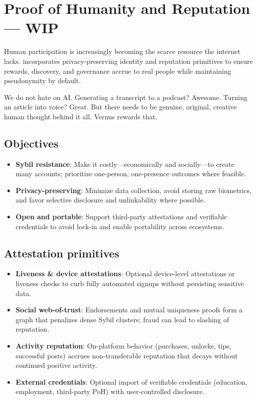 \documentclass[10pt]{article}
\begin{document}
  \section{Proof of Humanity and Reputation --- \textbf{WIP}}
    Human participation is increasingly becoming the scarce resource the internet lacks. \projectname{} incorporates privacy-preserving identity and reputation primitives to ensure rewards, discovery, and governance accrue to real people while maintaining pseudonymity by default.

    We do not hate on AI. Generating a transcript to a podcast? Awesome. Turning an article into voice? Great. But there needs to be genuine, original, creative human thought behind it all. Vernus rewards that.

    \subsection{Objectives}
      \begin{itemize}[leftmargin=*]
        \item \textbf{Sybil resistance}: Make it costly---economically and socially---to create many accounts; prioritize one-person, one-presence outcomes where feasible.
        \item \textbf{Privacy-preserving}: Minimize data collection, avoid storing raw biometrics, and favor selective disclosure and unlinkability where possible.
        \item \textbf{Open and portable}: Support third-party attestations and verifiable credentials to avoid lock-in and enable portability across ecosystems.
    \end{itemize}

    \subsection{Attestation primitives}
      \begin{itemize}[leftmargin=*]
        \item \textbf{Liveness \& device attestations}: Optional device-level attestations or liveness checks to curb fully automated signups without persisting sensitive data.
        \item \textbf{Social web-of-trust}: Endorsements and mutual uniqueness proofs form a graph that penalizes dense Sybil clusters; fraud can lead to slashing of reputation.
        \item \textbf{Activity reputation}: On-platform behavior (purchases, unlocks, tips, successful posts) accrues non-transferable reputation that decays without continued positive activity.
        \item \textbf{External credentials}: Optional import of verifiable credentials (education, employment, third-party PoH) with user-controlled disclosure.
      \end{itemize}
\end{document}
